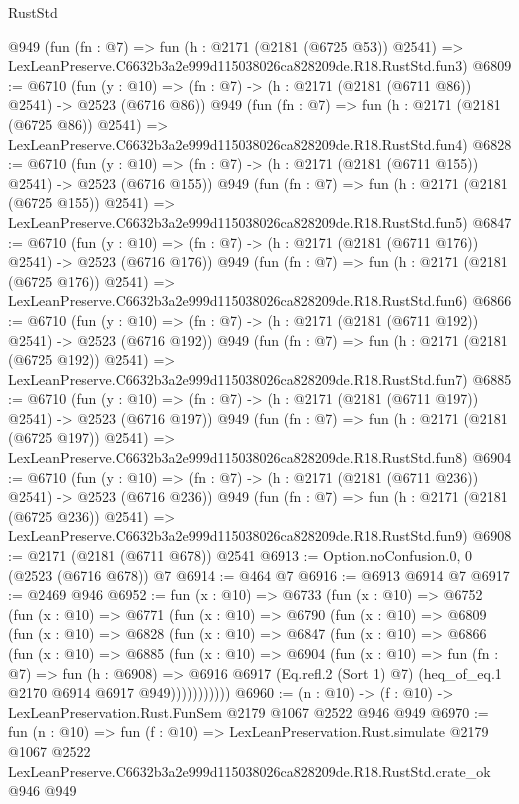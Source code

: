 \begin{lexlean}{RustStd}
\begin{coremodule}
    @949
    (fun (fn : @7) =>
    fun (h : @2171 (@2181 (@6725 @53)) @2541) =>
    LexLeanPreserve.C6632b3a2e999d115038026ca828209de.R18.RustStd.fun3)
@6809 := @6710
    (fun (y : @10) => (fn : @7) -> (h : @2171 (@2181 (@6711 @86)) @2541) -> @2523 (@6716 @86))
    @949
    (fun (fn : @7) =>
    fun (h : @2171 (@2181 (@6725 @86)) @2541) =>
    LexLeanPreserve.C6632b3a2e999d115038026ca828209de.R18.RustStd.fun4)
@6828 := @6710
    (fun (y : @10) => (fn : @7) -> (h : @2171 (@2181 (@6711 @155)) @2541) -> @2523 (@6716 @155))
    @949
    (fun (fn : @7) =>
    fun (h : @2171 (@2181 (@6725 @155)) @2541) =>
    LexLeanPreserve.C6632b3a2e999d115038026ca828209de.R18.RustStd.fun5)
@6847 := @6710
    (fun (y : @10) => (fn : @7) -> (h : @2171 (@2181 (@6711 @176)) @2541) -> @2523 (@6716 @176))
    @949
    (fun (fn : @7) =>
    fun (h : @2171 (@2181 (@6725 @176)) @2541) =>
    LexLeanPreserve.C6632b3a2e999d115038026ca828209de.R18.RustStd.fun6)
@6866 := @6710
    (fun (y : @10) => (fn : @7) -> (h : @2171 (@2181 (@6711 @192)) @2541) -> @2523 (@6716 @192))
    @949
    (fun (fn : @7) =>
    fun (h : @2171 (@2181 (@6725 @192)) @2541) =>
    LexLeanPreserve.C6632b3a2e999d115038026ca828209de.R18.RustStd.fun7)
@6885 := @6710
    (fun (y : @10) => (fn : @7) -> (h : @2171 (@2181 (@6711 @197)) @2541) -> @2523 (@6716 @197))
    @949
    (fun (fn : @7) =>
    fun (h : @2171 (@2181 (@6725 @197)) @2541) =>
    LexLeanPreserve.C6632b3a2e999d115038026ca828209de.R18.RustStd.fun8)
@6904 := @6710
    (fun (y : @10) => (fn : @7) -> (h : @2171 (@2181 (@6711 @236)) @2541) -> @2523 (@6716 @236))
    @949
    (fun (fn : @7) =>
    fun (h : @2171 (@2181 (@6725 @236)) @2541) =>
    LexLeanPreserve.C6632b3a2e999d115038026ca828209de.R18.RustStd.fun9)
@6908 := @2171 (@2181 (@6711 @678)) @2541
@6913 := Option.noConfusion.{0, 0} (@2523 (@6716 @678)) @7
@6914 := @464 @7
@6916 := @6913 @6914 @7
@6917 := @2469 @946
@6952 := fun (x : @10) =>
  @6733
    (fun (x : @10) =>
    @6752
      (fun (x : @10) =>
      @6771
        (fun (x : @10) =>
        @6790
          (fun (x : @10) =>
          @6809
            (fun (x : @10) =>
            @6828
              (fun (x : @10) =>
              @6847
                (fun (x : @10) =>
                @6866
                  (fun (x : @10) =>
                  @6885
                    (fun (x : @10) =>
                    @6904
                      (fun (x : @10) =>
                      fun (fn : @7) =>
                      fun (h : @6908) =>
                      @6916
                        @6917
                        (Eq.refl.{2} (Sort 1) @7)
                        (heq_of_eq.{1} @2170 @6914 @6917 @949)))))))))))
@6960 := (n : @10) -> (f : @10) -> LexLeanPreservation.Rust.FunSem @2179 @1067 @2522 @946 @949
@6970 := fun (n : @10) =>
  fun (f : @10) =>
  LexLeanPreservation.Rust.simulate
    @2179
    @1067
    @2522
    LexLeanPreserve.C6632b3a2e999d115038026ca828209de.R18.RustStd.crate_ok
    @946
    @949
\end{coremodule}
\end{lexlean}

